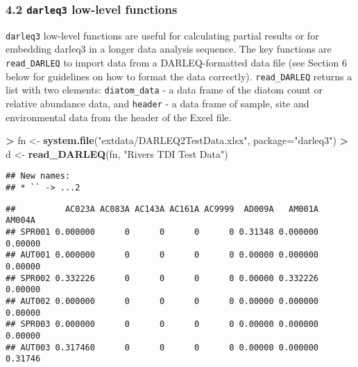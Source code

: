 \documentclass[]{article}
\newenvironment{Shaded}{\begin{snugshade}}{\end{snugshade}}
\newcommand{\KeywordTok}[1]{\textcolor[rgb]{0.13,0.29,0.53}{\textbf{#1}}}
\newcommand{\DataTypeTok}[1]{\textcolor[rgb]{0.13,0.29,0.53}{#1}}
\newcommand{\DecValTok}[1]{\textcolor[rgb]{0.00,0.00,0.81}{#1}}
\newcommand{\StringTok}[1]{\textcolor[rgb]{0.31,0.60,0.02}{#1}}
\newcommand{\OperatorTok}[1]{\textcolor[rgb]{0.81,0.36,0.00}{\textbf{#1}}}
\newcommand{\NormalTok}[1]{#1}
\begin{document}
\subsubsection{\texorpdfstring{4.2 \texttt{darleq3} low-level
functions}{4.2 darleq3 low-level functions}}\label{darleq3-low-level-functions}

\texttt{darleq3} low-level functions are useful for calculating partial
results or for embedding darleq3 in a longer data analysis sequence. The
key functions are \texttt{read\_DARLEQ} to import data from a
DARLEQ-formatted data file (see Section 6 below for guidelines on how to
format the data correctly). \texttt{read\_DARLEQ} returns a list with
two elements: \texttt{diatom\_data} - a data frame of the diatom count
or relative abundance data, and \texttt{header} - a data frame of
sample, site and environmental data from the header of the Excel file.

\begin{Shaded}
\begin{Highlighting}[]
\OperatorTok{>}\StringTok{ }\NormalTok{fn <-}\StringTok{ }\KeywordTok{system.file}\NormalTok{(}\StringTok{"extdata/DARLEQ2TestData.xlsx"}\NormalTok{, }\DataTypeTok{package=}\StringTok{"darleq3"}\NormalTok{)}
\OperatorTok{>}\StringTok{ }\NormalTok{d <-}\StringTok{ }\KeywordTok{read_DARLEQ}\NormalTok{(fn, }\StringTok{"Rivers TDI Test Data"}\NormalTok{)}
\end{Highlighting}
\end{Shaded}

\begin{verbatim}
## New names:
## * `` -> ...2
\end{verbatim}

\begin{Shaded}
\end{Shaded}

\begin{verbatim}
##          AC023A AC083A AC143A AC161A AC9999  AD009A   AM001A  AM004A
## SPR001 0.000000      0      0      0      0 0.31348 0.000000 0.00000
## AUT001 0.000000      0      0      0      0 0.00000 0.000000 0.00000
## SPR002 0.332226      0      0      0      0 0.00000 0.332226 0.00000
## AUT002 0.000000      0      0      0      0 0.00000 0.000000 0.00000
## SPR003 0.000000      0      0      0      0 0.00000 0.000000 0.00000
## AUT003 0.317460      0      0      0      0 0.00000 0.000000 0.31746
\end{verbatim}
\end{document}
